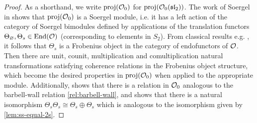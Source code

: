 


\begin{proof}
    As a shorthand, we write $\operatorname{proj}(\mathcal{O}_0)$ for $\operatorname{proj}(\mathcal{O}_0(\operatorname{\mathfrak{sl}}_2))$. The work of Soergel in \cite[Section 2.4]{soergel-category-O} shows that $\operatorname{proj}(\mathcal{O}_0)$ is a Soergel module, i.e. it has a left action of the category of Soergel bimodules defined by applications of the translation functors $\Theta_\varnothing, \Theta_s \in \operatorname{End}(\mathcal{O})$ (corresponding to elements in $S_2$).  From classical results e.g. \cite[Proposition 5.84 and Lemma 5.87]{mazorchuk-lectures-sl2-modules}, it follows that $\Theta_s$ is a Frobenius object in the category of endofunctors of $\mathcal{O}$. Then there are unit, counit, multiplication and comultiplication natural transformations satisfying coherence relations in the Frobenius object structure, which become the desired properties in $\operatorname{proj}(\mathcal{O}_0)$ when applied to the appropriate module. Additionally, \cite[Section 2.4]{soergel-category-O} shows that there is a relation in $\mathcal{O}_0$ analogous to the barbell-wall relation \eqref{rel:barbell-wall}, and \cite[Proposition 5.90]{mazorchuk-lectures-sl2-modules} shows that there is a natural isomorphism $\Theta_s \Theta_s \cong \Theta_s \oplus \Theta_s$ which is analogous to the isomorphism given by \autoref{lem:ss-equal-2s}.




\end{proof}
